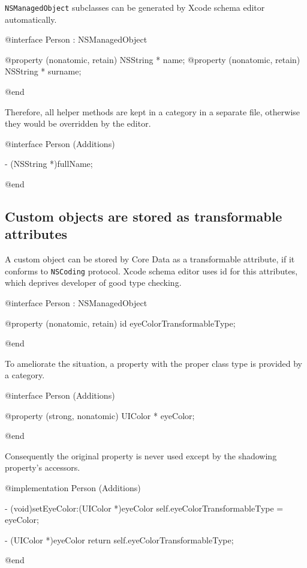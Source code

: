 \documentclass[10pt]{extarticle}
\newenvironment{codelisting}
{\footnotesize\mdframed[middlelinewidth=0.5pt, middlelinecolor=BaliHaiColor, skipabove=15pt]\verbatim}
{\endverbatim\endmdframed\vspace{12pt}\normalsize}
\newcommand{\inlinecode}[1]{{\textcolor{TundoraColor}{\texttt{#1}}}}
\begin{document}
\inlinecode{NSManagedObject} subclasses can be generated by Xcode schema editor automatically.

\begin{codelisting}
@interface Person : NSManagedObject

@property (nonatomic, retain) NSString * name;
@property (nonatomic, retain) NSString * surname;

@end
\end{codelisting}

Therefore, all helper methods are kept in a category in a separate file, otherwise they would be overridden by the editor.

\begin{codelisting}
@interface Person (Additions)

- (NSString *)fullName;

@end
\end{codelisting}

\subsection{Custom objects are stored as transformable attributes}

A custom object can be stored by Core Data as a transformable attribute, if it conforms to \inlinecode{NSCoding} protocol. Xcode schema editor uses id for this attributes, which deprives developer of good type checking.

\begin{codelisting}
@interface Person : NSManagedObject

@property (nonatomic, retain) id eyeColorTransformableType;

@end
\end{codelisting}

To ameliorate the situation, a property with the proper class type is provided by a category.

\begin{codelisting}
@interface Person (Additions)

@property (strong, nonatomic) UIColor * eyeColor;

@end
\end{codelisting}

Consequently the original property is never used except by the shadowing property's accessors.

\begin{codelisting}
@implementation Person (Additions)

- (void)setEyeColor:(UIColor *)eyeColor
{
    self.eyeColorTransformableType = eyeColor;
}

- (UIColor *)eyeColor
{
    return self.eyeColorTransformableType;
}

@end
\end{codelisting}
\end{document}
